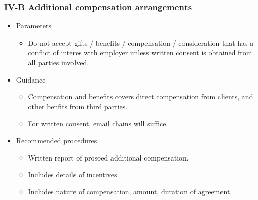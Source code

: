 \documentclass[../notes_compiled.tex]{subfiles}
\begin{document}
\subsubsection{IV-B Additional compensation arrangements}
\begin{itemize}
\item Parameters
\begin{itemize}
\item Do not accept gifts / benefits / compensation / consideration that has a conflict of interes with employer \underline{unless} written consent is obtained from all parties involved.
\end{itemize}
\item Guidance
\begin{itemize}
\item Compensation and benefits covers direct compensation from clients, and other benfits from third parties.
\item For written consent, email chains will suffice.
\end{itemize}
\item Recommended procedures
\begin{itemize}
\item Written report of prosoed additional compensation.
\item Includes details of incentives.
\item Includes nature of compensation, amount, duration of agreement.
\end{itemize}
\end{itemize}
\end{document}
